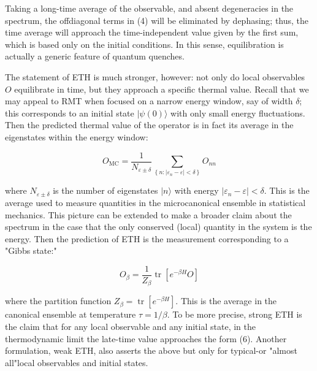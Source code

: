 \documentclass[12pt]{article}
\begin{document}
Taking a long-time average of the observable, and absent degeneracies in the spectrum, the offdiagonal terms in (4) will be eliminated by dephasing; thus, the time average will approach the time-independent value given by the first sum, which is based only on the initial conditions. In this sense, equilibration is actually a generic feature of quantum quenches.

The statement of ETH is much stronger, however: not only do local observables $O$ equilibrate in time, but they approach a specific thermal value. Recall that we may appeal to RMT when focused on a narrow energy window, say of width $\delta$; this corresponds to an initial state $|\psi(0)\rangle$ with only small energy fluctuations. Then the predicted thermal value of the operator is in fact its average in the eigenstates within the energy window:


\begin{equation*}
O_{\mathrm{MC}}=\frac{1}{N_{\varepsilon \pm \delta}} \sum_{\left\{n:\left|\varepsilon_{n}-\varepsilon\right|<\delta\right\}} O_{n n} \tag{5}
\end{equation*}


where $N_{\varepsilon \pm \delta}$ is the number of eigenstates $|n\rangle$ with energy $\left|\varepsilon_{n}-\varepsilon\right|<\delta$. This is the average used to measure quantities in the microcanonical ensemble in statistical mechanics. This picture can be extended to make a broader claim about the spectrum in the case that the only conserved (local) quantity in the system is the energy. Then the prediction of ETH is the measurement corresponding to a "Gibbs state:"


\begin{equation*}
O_{\beta}=\frac{1}{Z_{\beta}} \operatorname{tr}\left[e^{-\beta H} O\right] \tag{6}
\end{equation*}


where the partition function $Z_{\beta}=\operatorname{tr}\left[e^{-\beta H}\right]$. This is the average in the canonical ensemble at temperature $\tau=1 / \beta$. To be more precise, strong ETH is the claim that for any local observable and any initial state, in the thermodynamic limit the late-time value approaches the form (6). Another formulation, weak ETH, also asserts the above but only for typical-or "almost all"local observables and initial states.
\end{document}

